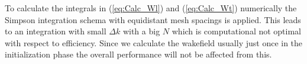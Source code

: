 

To calculate the integrals in (\ref{eq:Calc_Wl}) and (\ref{eq:Calc_Wt}) numerically the Simpson integration schema with equidistant mesh spacings is applied. This leads to an integration with small $\Delta k$ with a big $N$ which is computational not optimal with respect to efficiency. Since we calculate the wakefield usually just once in the initialization phase the overall performance will not be affected from this.

